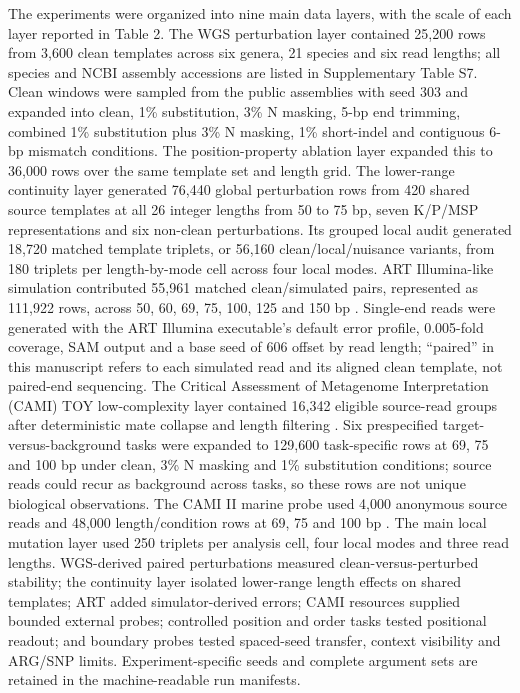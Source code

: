 The experiments were organized into nine main data layers, with the scale of each layer reported in Table 2. The WGS perturbation layer contained 25,200 rows from 3,600 clean templates across six genera, 21 species and six read lengths; all species and NCBI assembly accessions are listed in Supplementary Table S7. Clean windows were sampled from the public assemblies with seed 303 and expanded into clean, 1\% substitution, 3\% N masking, 5-bp end trimming, combined 1\% substitution plus 3\% N masking, 1\% short-indel and contiguous 6-bp mismatch conditions. The position-property ablation layer expanded this to 36,000 rows over the same template set and length grid. The lower-range continuity layer generated 76,440 global perturbation rows from 420 shared source templates at all 26 integer lengths from 50 to 75 bp, seven K/P/MSP representations and six non-clean perturbations. Its grouped local audit generated 18,720 matched template triplets, or 56,160 clean/local/nuisance variants, from 180 triplets per length-by-mode cell across four local modes. ART Illumina-like simulation contributed 55,961 matched clean/simulated pairs, represented as 111,922 rows, across 50, 60, 69, 75, 100, 125 and 150 bp \citep{Huang2012ART}. Single-end reads were generated with the ART Illumina executable's default error profile, 0.005-fold coverage, SAM output and a base seed of 606 offset by read length; ``paired'' in this manuscript refers to each simulated read and its aligned clean template, not paired-end sequencing. The Critical Assessment of Metagenome Interpretation (CAMI) TOY low-complexity layer contained 16,342 eligible source-read groups after deterministic mate collapse and length filtering \citep{Sczyrba2017}. Six prespecified target-versus-background tasks were expanded to 129,600 task-specific rows at 69, 75 and 100 bp under clean, 3\% N masking and 1\% substitution conditions; source reads could recur as background across tasks, so these rows are not unique biological observations. The CAMI II marine probe used 4,000 anonymous source reads and 48,000 length/condition rows at 69, 75 and 100 bp \citep{Meyer2022}. The main local mutation layer used 250 triplets per analysis cell, four local modes and three read lengths. WGS-derived paired perturbations measured clean-versus-perturbed stability; the continuity layer isolated lower-range length effects on shared templates; ART added simulator-derived errors; CAMI resources supplied bounded external probes; controlled position and order tasks tested positional readout; and boundary probes tested spaced-seed transfer, context visibility and ARG/SNP limits. Experiment-specific seeds and complete argument sets are retained in the machine-readable run manifests.

